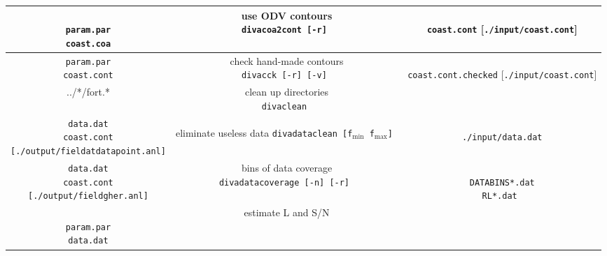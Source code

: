 \documentclass[8pt,a4paper,notitlepage]{book}
\begin{document}
\begin{table}
\begin{center}
{{\begin{tabular}{c|c|c}
 \shortstack{
 {  { }  } \\
{\tt param.par} \\
{\tt coast.coa} 
}
 & 
\shortstack{
{\sf use ODV contours} \\
{\tt divacoa2cont [-r]  } 
\\
{  { }  }
}
& 
\shortstack{
{  { }  } \\
{\tt coast.cont}  { } [{\tt ./input/coast.cont}] \\
{  { }  }
}
 \\ \hline
 \shortstack{
{\tt param.par} \\
{\tt coast.cont} 
}
 & 
\shortstack{
{\sf check hand-made contours} \\
{\tt divacck [-r] [-v]  } 
\\
{  { }  }
}
& 
\shortstack{
{  { }  } \\
{\tt coast.cont.checked}  { } [{\tt ./input/coast.cont}] \\
{  { }  }
}
 \\ \hline
 ../*/fort.*
 & 
 \shortstack{
 {\sf clean up directories} \\
{\tt divaclean  } 
}
& 
 { }
 \\ \hline
 \shortstack{
{\tt data.dat} \\
{\tt coast.cont} \\
{\tt [./output/fieldatdatapoint.anl]} 
}
 & 
\shortstack{
{\sf eliminate useless data} \\
{\tt divadataclean  [f$_{\min}$  f$_{\max}$]  } 
\\
{  { }  }
}
& 
\shortstack{
{  { }  } \\
{\tt ./input/data.dat} \\
{  { }  }
}
 \\ \hline
 \shortstack{
{\tt data.dat} \\
{\tt coast.cont} \\
{\tt [./output/fieldgher.anl]} 
}
 & 
\shortstack{
{\sf bins of data coverage} \\
{\tt divadatacoverage  [-n] [-r]  } 
\\
{  { }  }
}
& 
\shortstack{
{  { }  } \\
{\tt DATABINS*.dat} \\
{  {\tt RL*.dat }  }
}
 \\ \hline
 \shortstack{
 {  { }  } \\
{\tt param.par} \\
{\tt data.dat} \\
{  { }  } 
}
 & 
\shortstack{
{\sf estimate L and S/N} \\
}
\end{tabular}}}
\end{center}
\end{table}
\end{document}
